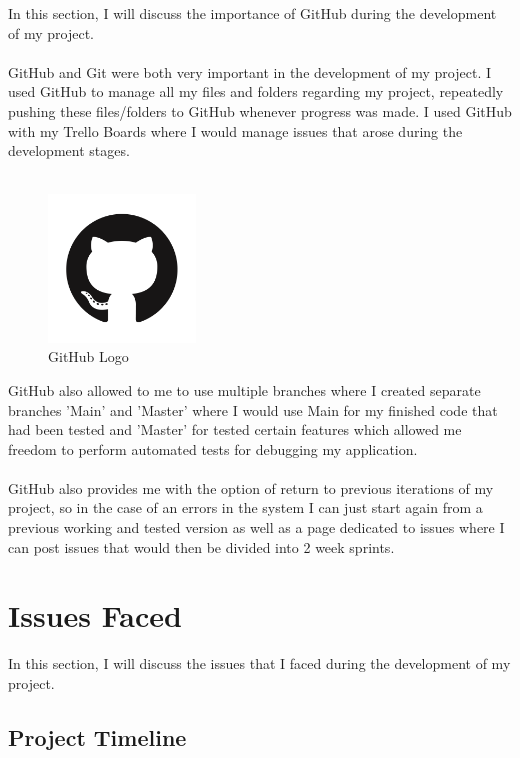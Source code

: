 In this section, I will discuss the importance of GitHub during the development of my project. \\ \\
GitHub and Git were both very important in the development of my project. I used GitHub to manage all my files and folders regarding my project, repeatedly pushing these files/folders to GitHub whenever progress was made. I used GitHub with my Trello Boards where I would manage issues that arose during the development stages.\\ \\
\begin{figure}
  \begin{center}
    \includegraphics[width=0.35\textwidth]{img/githublogo.png}
  \end{center}
  \caption{GitHub Logo}
  \label{fig:Image of GitHub Logo}
\end{figure}
GitHub also allowed to me to use multiple branches where I created separate branches 'Main' and 'Master' where I would use Main for my finished code that had been tested and 'Master' for tested certain features which allowed me freedom to perform automated tests for debugging my application. \\ \\
GitHub also provides me with the option of return to previous iterations of my project, so in the case of an errors in the system I can just start again from a previous working and tested version as well as a page dedicated to issues where I can post issues that would then be divided into 2 week sprints.

\section{Issues Faced}

In this section, I will discuss the issues that I faced during the development of my project.

\subsection{Project Timeline}

